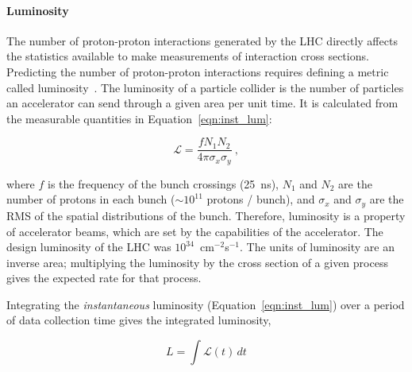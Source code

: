 \paragraph*{Luminosity} \hfill \break
The number of proton-proton interactions generated by the LHC directly affects the statistics available to make measurements of interaction cross sections.
Predicting the number of proton-proton interactions requires defining a metric called luminosity~\cite{zyla_review_2020}. The luminosity of a particle collider is the number of particles an accelerator can send through a given area per unit time. It is calculated from the measurable quantities in Equation~\ref{eqn:inst_lum}:

\begin{equation}
\mathcal{L} = \frac{f N_{1} N_{2} }{4 \pi \sigma_{x} \sigma_{y}}~,
\label{eqn:inst_lum}
\end{equation}

where $f$ is the frequency of the bunch crossings (\SI{25}{\nano\second}), $N_{1}$ and $N_{2}$ are the number of protons in each bunch ($\sim 10^{11}$ protons / bunch), and $\sigma_{x}$ and $\sigma_{y}$ are the RMS of the spatial distributions of the bunch. Therefore, luminosity is a property of accelerator beams, which are set by the capabilities of the accelerator. The design luminosity of the LHC was $10^{34}$~cm$^{-2}$s$^{-1}$. The units of luminosity are an inverse area; multiplying the luminosity by the cross section of a given process gives the expected rate for that process.

Integrating the \textit{instantaneous} luminosity (Equation~\ref{eqn:inst_lum}) over a period of data collection time gives the integrated luminosity,

\begin{equation}
L = \int \mathcal{L} \left( t \right) \,dt
\label{eqn:int_lum}
\end{equation}

